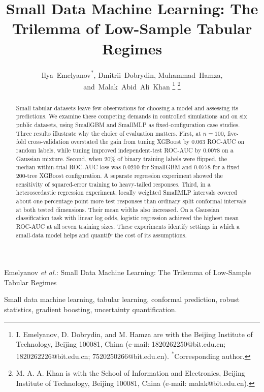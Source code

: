 \documentclass[journal]{IEEEtran}
\begin{document}
\title{Small Data Machine Learning: The Trilemma of Low-Sample Tabular Regimes}

\author{Ilya~Emelyanov\textsuperscript{*},
        Dmitrii~Dobrydin,
        Muhammad~Hamza,
        and~Malak~Abid~Ali~Khan%
\thanks{I. Emelyanov, D. Dobrydin, and M. Hamza are with the Beijing Institute of Technology, Beijing 100081, China (e-mail: 1820262250@bit.edu.cn; 1820262226@bit.edu.cn; 7520250266@bit.edu.cn). \textsuperscript{*}Corresponding author.}%
\thanks{M. A. A. Khan is with the School of Information and Electronics, Beijing Institute of Technology, Beijing 100081, China (e-mail: malak@bit.edu.cn).}}

%
{Emelyanov \MakeLowercase{\textit{et al.}}: Small Data Machine Learning: The Trilemma of Low-Sample Tabular Regimes}

\maketitle

\begin{abstract}
Small tabular datasets leave few observations for choosing a model and assessing its predictions. We examine these competing demands in controlled simulations and on six public datasets, using SmallGBM and SmallMLP as fixed-configuration case studies. Three results illustrate why the choice of evaluation matters. First, at $n=100$, five-fold cross-validation overstated the gain from tuning XGBoost by 0.063 ROC-AUC on random labels, while tuning improved independent-test ROC-AUC by 0.0078 on a Gaussian mixture. Second, when 20\% of binary training labels were flipped, the median within-trial ROC-AUC loss was 0.0210 for SmallGBM and 0.0778 for a fixed 200-tree XGBoost configuration. A separate regression experiment showed the sensitivity of squared-error training to heavy-tailed responses. Third, in a heteroscedastic regression experiment, locally weighted SmallMLP intervals covered about one percentage point more test responses than ordinary split conformal intervals at both tested dimensions. Their mean widths also increased. On a Gaussian classification task with linear log odds, logistic regression achieved the highest mean ROC-AUC at all seven training sizes. These experiments identify settings in which a small-data model helps and quantify the cost of its assumptions.
\end{abstract}

\begin{IEEEkeywords}
Small data machine learning, tabular learning, conformal prediction, robust statistics, gradient boosting, uncertainty quantification.
\end{IEEEkeywords}
\end{document}
